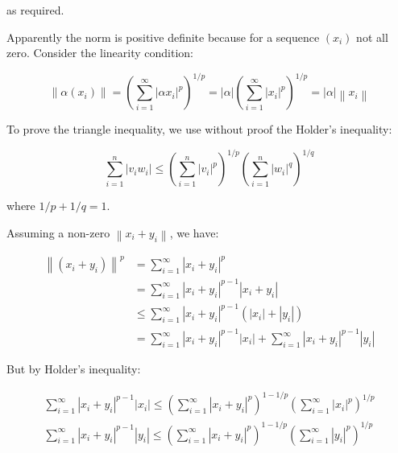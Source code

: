 \documentclass[12pt]{article}
\begin{document}
as required.

Apparently the norm is positive definite because for a sequence $(x_{i})$ not all zero. Consider the linearity condition:

\begin{equation}
    \left\lVert \alpha (x_{i}) \right\rVert = \left( \sum_{i = 1}^{\infty} \left\lvert \alpha x_{i} \right\rvert^{p} \right)^{1/p} = \left\lvert \alpha \right\rvert \left( \sum_{i = 1}^{\infty} \left\lvert x_{i} \right\rvert^{p} \right)^{1/p} = \left\lvert \alpha \right\rvert \left\lVert x_{i} \right\rVert
\end{equation}

To prove the triangle inequality, we use without proof the Holder's inequality:

\begin{equation}
    \sum_{i = 1}^{n} \left\lvert v_{i} w_{i} \right\rvert \leq \left( \sum_{i = 1}^{n} \left\lvert v_{i} \right\rvert^{p} \right)^{1/p} \left( \sum_{i = 1}^{n} \left\lvert w_{i} \right\rvert^{q} \right)^{1/q}
\end{equation}

where $1/p + 1/q = 1$.

Assuming a non-zero $\left\lVert x_{i} + y_{i} \right\rVert$, we have:

\begin{equation}
\begin{split}
    \left\lVert (x_{i} + y_{i}) \right\rVert^{p} &= \sum_{i = 1}^{\infty} \left\lvert x_{i} + y_{i} \right\rvert^{p} \\
    &= \sum_{i = 1}^{\infty} \left\lvert x_{i} + y_{i} \right\rvert^{p - 1} \left\lvert x_{i} + y_{i} \right\rvert \\
    &\leq \sum_{i = 1}^{\infty} \left\lvert x_{i} + y_{i} \right\rvert^{p - 1} \left( \left\lvert x_{i} \right\rvert + \left\lvert y_{i} \right\rvert \right) \\
    &= \sum_{i = 1}^{\infty} \left\lvert x_{i} + y_{i} \right\rvert^{p - 1} \left\lvert x_{i} \right\rvert + \sum_{i = 1}^{\infty} \left\lvert x_{i} + y_{i} \right\rvert^{p - 1} \left\lvert y_{i} \right\rvert
\end{split}
\end{equation}

But by Holder's inequality:

\begin{equation}
\begin{split}
    \sum_{i = 1}^{\infty} \left\lvert x_{i} + y_{i} \right\rvert^{p - 1} \left\lvert x_{i} \right\rvert \leq \left( \sum_{i = 1}^{\infty} \left\lvert x_{i} + y_{i} \right\rvert^{p} \right)^{1 - 1/p} \left( \sum_{i = 1}^{\infty} \left\lvert x_{i} \right\rvert^{p} \right)^{1/p} \\
    \sum_{i = 1}^{\infty} \left\lvert x_{i} + y_{i} \right\rvert^{p - 1} \left\lvert y_{i} \right\rvert \leq \left( \sum_{i = 1}^{\infty} \left\lvert x_{i} + y_{i} \right\rvert^{p} \right)^{1 - 1/p} \left( \sum_{i = 1}^{\infty} \left\lvert y_{i} \right\rvert^{p} \right)^{1/p}
\end{split}
\end{equation}
\end{document}
